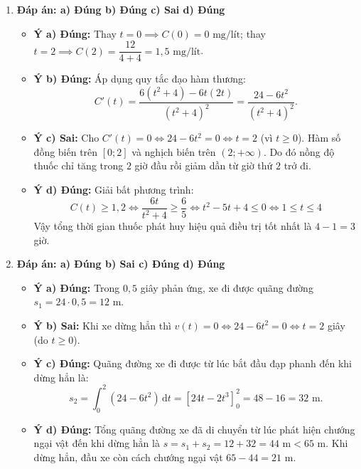 \documentclass[12pt,a4paper]{article}
\begin{document}
\begin{enumerate}[label=\textbf{Câu \arabic*:}, leftmargin=*]

\item \textbf{Đáp án: a) Đúng \quad b) Đúng \quad c) Sai \quad d) Đúng}
\begin{itemize}
    \item \textbf{Ý a) Đúng:} Thay $t = 0 \implies C(0) = 0\text{ mg/lít}$; thay $t = 2 \implies C(2) = \dfrac{12}{4 + 4} = 1{,}5\text{ mg/lít}$.
    \item \textbf{Ý b) Đúng:} Áp dụng quy tắc đạo hàm thương:
    $$C'(t) = \dfrac{6(t^2 + 4) - 6t(2t)}{(t^2 + 4)^2} = \dfrac{24 - 6t^2}{(t^2 + 4)^2}.$$
    \item \textbf{Ý c) Sai:} Cho $C'(t) = 0 \iff 24 - 6t^2 = 0 \iff t = 2$ (vì $t \ge 0$). Hàm số đồng biến trên $[0; 2]$ và nghịch biến trên $(2; +\infty)$. Do đó nồng độ thuốc chỉ tăng trong $2$ giờ đầu rồi giảm dần từ giờ thứ $2$ trở đi.
    \item \textbf{Ý d) Đúng:} Giải bất phương trình:
    $$C(t) \ge 1{,}2 \iff \dfrac{6t}{t^2 + 4} \ge \dfrac{6}{5} \iff t^2 - 5t + 4 \le 0 \iff 1 \le t \le 4$$
    Vậy tổng thời gian thuốc phát huy hiệu quả điều trị tốt nhất là $4 - 1 = 3$ giờ.
\end{itemize}

\item \textbf{Đáp án: a) Đúng \quad b) Sai \quad c) Đúng \quad d) Đúng}
\begin{itemize}
    \item \textbf{Ý a) Đúng:} Trong $0{,}5$ giây phản ứng, xe đi được quãng đường $s_1 = 24 \cdot 0{,}5 = 12\text{ m}$.
    \item \textbf{Ý b) Sai:} Khi xe dừng hẳn thì $v(t) = 0 \iff 24 - 6t^2 = 0 \iff t = 2$ giây (do $t \ge 0$).
    \item \textbf{Ý c) Đúng:} Quãng đường xe đi được từ lúc bắt đầu đạp phanh đến khi dừng hẳn là:
    $$s_2 = \int_{0}^{2} (24 - 6t^2)\,\mathrm{d}t = \left[24t - 2t^3\right]_{0}^{2} = 48 - 16 = 32\text{ m}.$$
    \item \textbf{Ý d) Đúng:} Tổng quãng đường xe đã di chuyển từ lúc phát hiện chướng ngại vật đến khi dừng hẳn là $s = s_1 + s_2 = 12 + 32 = 44\text{ m} < 65\text{ m}$. Khi dừng hẳn, đầu xe còn cách chướng ngại vật $65 - 44 = 21\text{ m}$.
\end{itemize}


\end{enumerate}
\end{document}
